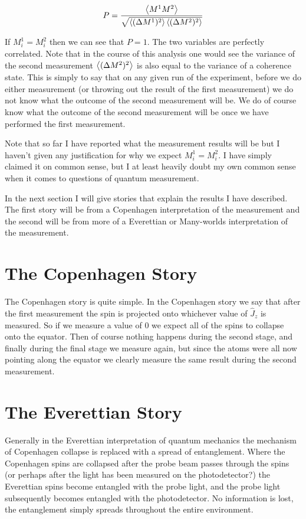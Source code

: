 \documentclass[12pt]{article}
\begin{document}
\begin{align}
P = \frac{\Braket{M^1 M^2}}{\sqrt{\Braket{(\Delta M^1)^2}\Braket{(\Delta M^2)^2}}}
\end{align}

If $M^1_i = M^2_i$ then we can see that $P = 1$. The two variables are perfectly correlated. Note that in the course of this analysis one would see the variance of the second measurement $\Braket{(\Delta M^2)^2}$ is also equal to the variance of a coherence state. This is simply to say that on any given run of the experiment, before we do either measurement (or throwing out the result of the first measurement) we do not know what the outcome of the second measurement will be. We do of course know what the outcome of the second measurement will be once we have performed the first measurement.

Note that so far I have reported what the measurement results will be but I haven't given any justification for why we expect $M^1_i = M^2_i$. I have simply claimed it on common sense, but I at least heavily doubt my own common sense when it comes to questions of quantum measurement.

In the next section I will give stories that explain the results I have described. The first story will be from a Copenhagen interpretation of the measurement and the second will be from more of a Everettian or Many-worlds interpretation of the measurement.

\section{The Copenhagen Story}

The Copenhagen story is quite simple. In the Copenhagen story we say that after the first measurement the spin is projected onto whichever value of $\hat{J}_z$ is measured. So if we measure a value of $0$ we expect all of the spins to collapse onto the equator. Then of course nothing happens during the second stage, and finally during the final stage we measure again, but since the atoms were all now pointing along the equator we clearly measure the same result during the second measurement.

\section{The Everettian Story}

Generally in the Everettian interpretation of quantum mechanics the mechanism of Copenhagen collapse is replaced with a spread of entanglement. Where the Copenhagen spins are collapsed after the probe beam passes through the spins (or perhaps after the light has been measured on the photodetector?) the Everettian spins become entangled with the probe light, and the probe light subsequently becomes entangled with the photodetector. No information is lost, the entanglement simply spreads throughout the entire environment.
\end{document}
